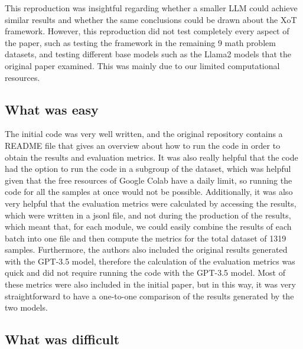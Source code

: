 \documentclass[10pt]{article} %
\begin{document}
This reproduction was insightful regarding whether a smaller LLM could achieve similar results and whether the same conclusions could be drawn about the XoT framework. However, this reproduction did not test completely every aspect of the paper, such as testing the framework in the remaining 9 math problem datasets, and testing different base models such as the Llama2 models that the original paper examined. This was mainly due to our limited computational resources.

\subsection{What was easy}

The initial code was very well written, and the original repository contains a README file that gives an overview about how to run the code in order to obtain the results and evaluation metrics. It was also really helpful that the code had the option to run the code in a subgroup of the dataset, which was helpful given that the free resources of Google Colab have a daily limit, so running the code for all the samples at once would not be possible. Additionally, it was also very helpful that the evaluation metrics were calculated by accessing the results, which were written in a jsonl file, and not during the production of the results, which meant that, for each module, we could easily combine the results of each batch into one file and then compute the metrics for the total dataset of 1319 samples. Furthermore, the authors also included the original results generated with the GPT-3.5 model, therefore the calculation of the evaluation metrics was quick and did not require running the code with the GPT-3.5 model. Most of these metrics were also included in the initial paper, but in this way, it was very straightforward to have a one-to-one comparison of the results generated by the two models.

\subsection{What was difficult}
\end{document}
